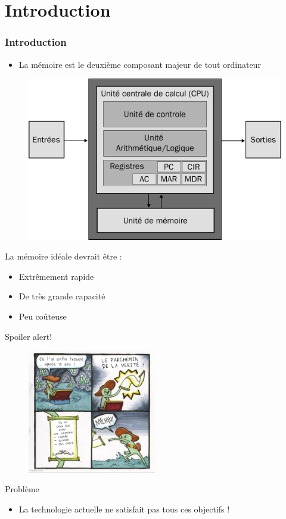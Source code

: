 \documentclass[8pt]{beamer}
\begin{document}
\section*{Introduction}
\begin{frame}
    \frametitle{Introduction}
    \begin{itemize}
        \item La mémoire est le deuxième composant majeur de tout ordinateur
    \end{itemize}
    \begin{figure}
        \centering

        \includegraphics[width=.45\textwidth]{figures/Von-Neumann-Architecture-Diagram.pdf}
        \label{fig:sub1}
    \end{figure}
    \begin{block}{La mémoire idéale devrait être :}
        \begin{itemize}
            \item Extrêmement rapide
            \item De très grande capacité
            \item Peu coûteuse
        \end{itemize}
    \end{block}

\end{frame}

\begin{frame}{Spoiler alert!}
    \begin{figure}
        \centering
        \includegraphics[width=0.5\textwidth]{figures/meme.png}
        \label{fig:memory_speed}
    \end{figure}
    \pause
    \begin{alertblock}{Problème}
        \begin{itemize}
            \item La technologie actuelle ne satisfait pas tous ces objectifs !
        \end{itemize}
    \end{alertblock}
\end{frame}
\end{document}
